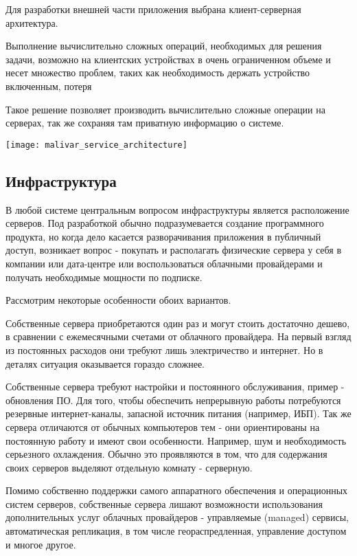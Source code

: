 Для разработки внешней части приложения выбрана клиент-серверная архитектура.

Выполнение вычислительно сложных операций, необходимых для решения задачи, возможно на клиентских устройствах в очень ограниченном объеме и несет множество проблем, таких как необходимость держать устройство включенным, потеря

Такое решение позволяет производить вычислительно сложные операции на серверах, так же сохраняя там приватную информацию о системе.

\texttt{[image: malivar\_service\_architecture]}

\subsection{Инфраструктура}

В любой системе центральным вопросом инфраструктуры является расположение серверов. Под разработкой обычно подразумевается создание программного продукта, но когда дело касается разворачивания приложения в публичный доступ, возникает вопрос - покупать и располагать физические сервера у себя в компании или дата-центре или воспользоваться облачными провайдерами и получать необходимые мощности по подписке.

Рассмотрим некоторые особенности обоих вариантов.

Собственные сервера приобретаются один раз и могут стоить достаточно дешево, в сравнении с ежемесячными счетами от облачного провайдера. На первый взгляд из постоянных расходов они требуют лишь электричество и интернет. Но в деталях ситуация оказывается гораздо сложнее.

Собственные сервера требуют настройки и постоянного обслуживания, пример - обновления ПО. Для того, чтобы обеспечить непрерывную работы потребуются резервные интернет-каналы, запасной источник питания (например, ИБП).
Так же сервера отличаются от обычных компьютеров тем - они ориентированы на постоянную работу и имеют свои особенности. Например, шум и необходимость серьезного охлаждения. Обычно это проявляются в том, что для содержания своих серверов выделяют отдельную комнату - серверную.

Помимо собственно поддержки самого аппаратного обеспечения и операционных систем серверов, собственные сервера лишают возможности использования дополнительных услуг облачных провайдеров - управляемые (managed) сервисы, автоматическая репликация, в том числе геораспредленная, управление доступом и многое другое.

